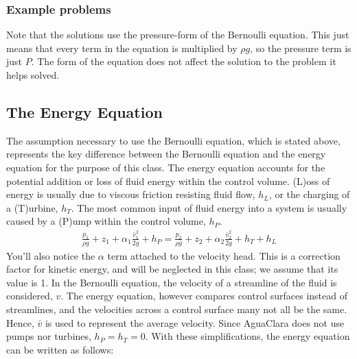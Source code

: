 \documentclass[letterpaper,10pt,english]{sphinxmanual}
\begin{document}
\subsubsection{Example problems}
\label{\detokenize{Fluids_Review/Fluids_Review_Design:example-problems}}
 Note that the solutions use the pressure-form of the Bernoulli equation. This just means that every term in the equation is multiplied by \(\rho g\), so the pressure term is just \(P\). The form of the equation does not affect the solution to the problem it helps solved.


\subsection{The Energy Equation}
\label{\detokenize{Fluids_Review/Fluids_Review_Design:the-energy-equation}}\label{\detokenize{Fluids_Review/Fluids_Review_Design:energy-equation}}
The assumption necessary to use the Bernoulli equation, which is stated above, represents the key difference between the Bernoulli equation and the energy equation for the purpose of this class. The energy equation accounts for the potential addition or loss of fluid energy within the control volume. (L)oss of energy is usually due to viscous friction resisting fluid flow, \(h_L\), or the charging of a (T)urbine, \(h_T\). The most common input of fluid energy into a system is usually caused by a (P)ump within the control volume, \(h_P\).
\begin{equation}\label{equation:Fluids_Review/Fluids_Review_Design:Fluids_Review/Fluids_Review_Design:7}
\begin{split}\frac{p_{1}}{\rho g} + z_{1} + \alpha_{1} \frac{\bar v_{1}^2}{2g} + h_P = \frac{p_{2}}{\rho g} + z_{2} + {\alpha_{2}} \frac{\bar v_{2}^2}{2g} + h_T + h_L\end{split}
\end{equation}
You’ll also notice the \(\alpha\) term attached to the velocity head. This is a correction factor for kinetic energy, and will be neglected in this class; we assume that its value is 1. In the Bernoulli equation, the velocity of a streamline of the fluid is considered, \(v\). The energy equation, however compares control surfaces instead of streamlines, and the velocities across a control surface many not all be the same. Hence, \(\bar v\) is used to represent the average velocity. Since AguaClara does not use pumps nor turbines, \(h_P = h_T = 0\). With these simplifications, the energy equation can be written as follows:
\end{document}
